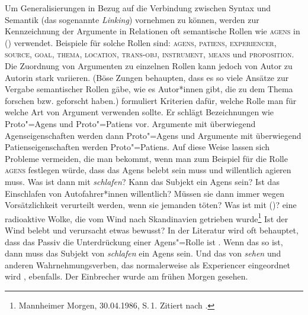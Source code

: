 \noindent
Um Generalisierungen in Bezug auf die Verbindung zwischen Syntax und Semantik (das sogenannte
\emph{Linking}) vornehmen zu können, werden zur Kennzeichnung der Argumente
in Relationen oft semantische Rollen \citep{Fillmore68,Fillmore77,Kunze91} wie
\textsc{agens} in () verwendet. Beispiele für solche Rollen sind: 
\textsc{agens}, 
\textsc{patiens}, 
\textsc{experiencer}, 
\textsc{source}, 
\textsc{goal}, 
\textsc{thema}, 
\textsc{location}, 
\textsc{trans-obj}, 
\textsc{instrument}, 
\textsc{means} und 
\textsc{proposition}.
Die Zuordnung von Argumenten zu einzelnen Rollen kann jedoch von Autor zu Autorin stark
variieren. (Böse Zungen behaupten, dass es so viele Ansätze zur Vergabe semantischer Rollen gäbe,
wie es Autor*innen gibt, die zu dem Thema forschen bzw. geforscht haben.)
\citet{Dowty91a} formuliert Kriterien dafür, welche Rolle man für welche Art von Argument
verwenden sollte. Er schlägt Bezeichnungen wie Proto"=Agens und Proto"=Patiens vor. Argumente mit
überwiegend Agenseigenschaften werden dann Proto"=Agens und Argumente mit überwiegend Patienseigenschaften
werden Proto"=Patiens. Auf diese Weise lassen sich Probleme vermeiden, die man bekommt, wenn man zum
Beispiel für die Rolle \textsc{agens} festlegen würde, dass das Agens belebt sein muss und
willentlich agieren muss. Was ist dann mit \emph{schlafen}? Kann das Subjekt ein Agens sein? Ist das
Einschlafen von Autofahrer*innen willentlich? Müssen sie dann immer wegen Vorsätzlichkeit verurteilt
werden, wenn sie jemanden töten? Was ist mit ()? 
\ea
eine radioaktive Wolke, die vom Wind nach Skandinavien getrieben wurde\footnote{
  Mannheimer Morgen, 30.04.1986, S.\,1. Zitiert nach .
}
\z
Ist der Wind belebt und verursacht etwas bewusst? In der Literatur wird oft
behauptet, dass das Passiv die Unterdrückung einer Agens"=Rolle ist \parencites[]{Haider86}[300]{Wunderlich87c}. Wenn das so ist, dann muss das
Subjekt von \emph{schlafen} ein Agens sein. Und das von \emph{sehen} und anderen Wahrnehmungsverben, das normalerweise als
Experiencer eingeordnet wird \parencites[]{Devlin92}[]{Dowty2000a}, ebenfalls.
\ea
Der Einbrecher wurde am frühen Morgen gesehen.
\z

